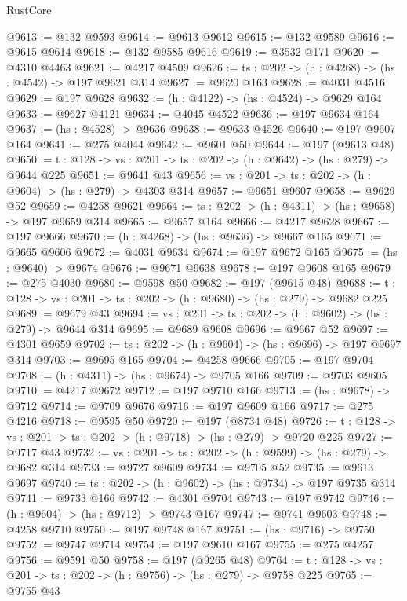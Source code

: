 \begin{lexlean}{RustCore}
\begin{coremodule}
@9613 := @132 @9593
@9614 := @9613 @9612
@9615 := @132 @9589
@9616 := @9615 @9614
@9618 := @132 @9585 @9616
@9619 := @3532 @171
@9620 := @4310 @4463
@9621 := @4217 @4509
@9626 := {ts : @202} -> (h : @4268) -> (hs : @4542) -> @197 @9621 @314
@9627 := @9620 @163
@9628 := @4031 @4516
@9629 := @197 @9628
@9632 := (h : @4122) -> (hs : @4524) -> @9629 @164
@9633 := @9627 @4121
@9634 := @4045 @4522
@9636 := @197 @9634 @164
@9637 := (hs : @4528) -> @9636
@9638 := @9633 @4526
@9640 := @197 @9607 @164
@9641 := @275 @4044
@9642 := @9601 @50
@9644 := @197 (@9613 @48)
@9650 := {t : @128} -> {vs : @201} -> {ts : @202} -> (h : @9642) -> (hs : @279) -> @9644 @225
@9651 := @9641 @43
@9656 := {vs : @201} -> {ts : @202} -> (h : @9604) -> (hs : @279) -> @4303 @314
@9657 := @9651 @9607
@9658 := @9629 @52
@9659 := @4258 @9621
@9664 := {ts : @202} -> (h : @4311) -> (hs : @9658) -> @197 @9659 @314
@9665 := @9657 @164
@9666 := @4217 @9628
@9667 := @197 @9666
@9670 := (h : @4268) -> (hs : @9636) -> @9667 @165
@9671 := @9665 @9606
@9672 := @4031 @9634
@9674 := @197 @9672 @165
@9675 := (hs : @9640) -> @9674
@9676 := @9671 @9638
@9678 := @197 @9608 @165
@9679 := @275 @4030
@9680 := @9598 @50
@9682 := @197 (@9615 @48)
@9688 := {t : @128} -> {vs : @201} -> {ts : @202} -> (h : @9680) -> (hs : @279) -> @9682 @225
@9689 := @9679 @43
@9694 := {vs : @201} -> {ts : @202} -> (h : @9602) -> (hs : @279) -> @9644 @314
@9695 := @9689 @9608
@9696 := @9667 @52
@9697 := @4301 @9659
@9702 := {ts : @202} -> (h : @9604) -> (hs : @9696) -> @197 @9697 @314
@9703 := @9695 @165
@9704 := @4258 @9666
@9705 := @197 @9704
@9708 := (h : @4311) -> (hs : @9674) -> @9705 @166
@9709 := @9703 @9605
@9710 := @4217 @9672
@9712 := @197 @9710 @166
@9713 := (hs : @9678) -> @9712
@9714 := @9709 @9676
@9716 := @197 @9609 @166
@9717 := @275 @4216
@9718 := @9595 @50
@9720 := @197 (@8734 @48)
@9726 := {t : @128} -> {vs : @201} -> {ts : @202} -> (h : @9718) -> (hs : @279) -> @9720 @225
@9727 := @9717 @43
@9732 := {vs : @201} -> {ts : @202} -> (h : @9599) -> (hs : @279) -> @9682 @314
@9733 := @9727 @9609
@9734 := @9705 @52
@9735 := @9613 @9697
@9740 := {ts : @202} -> (h : @9602) -> (hs : @9734) -> @197 @9735 @314
@9741 := @9733 @166
@9742 := @4301 @9704
@9743 := @197 @9742
@9746 := (h : @9604) -> (hs : @9712) -> @9743 @167
@9747 := @9741 @9603
@9748 := @4258 @9710
@9750 := @197 @9748 @167
@9751 := (hs : @9716) -> @9750
@9752 := @9747 @9714
@9754 := @197 @9610 @167
@9755 := @275 @4257
@9756 := @9591 @50
@9758 := @197 (@9265 @48)
@9764 := {t : @128} -> {vs : @201} -> {ts : @202} -> (h : @9756) -> (hs : @279) -> @9758 @225
@9765 := @9755 @43

\end{coremodule}
\end{lexlean}
